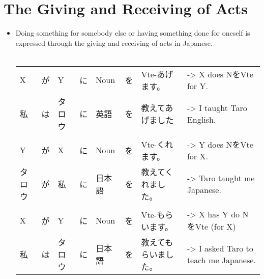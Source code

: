 \documentclass{article}
\begin{document}
\section{The Giving and Receiving of Acts}
\begin{itemize}
\item Doing something for somebody else or having something done for oneself is expressed through the giving and receiving of acts in Japanese. \\　\vspace{2 mm} \\
\begin{tabular}{ l l l l l l l | l }
X&が&Y&に&Noun&を&Vte-あげます。&-> X does NをVte for Y. \\ 
私&は&タロウ&に&英語&を&教えてあげました&-> I taught Taro English. \\
\\
Y&が&X&に&Noun&を&Vte-くれます。&-> Y does NをVte for X. \\ 
タロウ&が&私&に&日本語&を&教えてくれました。&-> Taro taught me Japanese. \\
\\ 
X&が&Y&に&Noun&を&Vte-もらいます。&-> X has Y do NをVte (for X) \\ 
私&は&タロウ&に&日本語&を&教えてもらいました。&-> I asked Taro to teach me Japanese.
\end{tabular}
\end{itemize}
\end{document}
